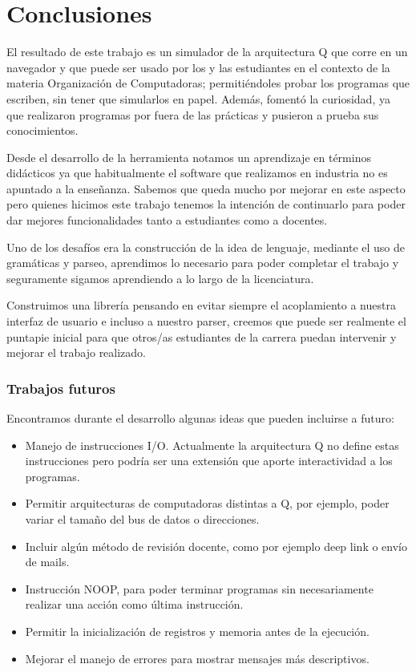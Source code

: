 \part{Conclusiones}
\label{parte_conclusiones}
El resultado de este trabajo es un simulador de la arquitectura Q que corre en un navegador y que puede ser usado por los y las estudiantes en 
el contexto de la materia Organización de Computadoras; permitiéndoles probar los programas que escriben, sin tener que simularlos en papel.
Además, fomentó la curiosidad, ya que realizaron programas por fuera de las prácticas y pusieron a prueba sus conocimientos. 

Desde el desarrollo de la herramienta notamos un aprendizaje en términos didácticos ya que habitualmente el software que realizamos en 
industria no es apuntado a la enseñanza. Sabemos que queda mucho por mejorar en este aspecto pero quienes hicimos este trabajo tenemos 
la intención de continuarlo para poder dar mejores funcionalidades tanto a estudiantes como a docentes.

Uno de los desafíos era la construcción de la idea de lenguaje, mediante el uso de gramáticas y parseo, aprendimos lo necesario para poder
completar el trabajo y seguramente sigamos aprendiendo a lo largo de la licenciatura.

Construimos una librería pensando en evitar siempre el acoplamiento a nuestra interfaz de usuario e incluso a nuestro parser, creemos que 
puede ser realmente el puntapie inicial para que otros/as estudiantes de la carrera puedan intervenir y mejorar el trabajo realizado.

\section{Trabajos futuros}
Encontramos durante el desarrollo algunas ideas que pueden incluirse a futuro:
\begin{itemize}
  \item Manejo de instrucciones I/O. Actualmente la arquitectura Q no define estas instrucciones pero podría ser una extensión que aporte
  interactividad a los programas.
  \item Permitir arquitecturas de computadoras distintas a Q, por ejemplo, poder variar el tamaño del bus de datos o direcciones.
  \item Incluir algún método de revisión docente, como por ejemplo deep link o envío de mails.
  \item Instrucción NOOP, para poder terminar programas sin necesariamente realizar una acción como última instrucción.
  \item Permitir la inicialización de registros y memoria antes de la ejecución.
  \item Mejorar el manejo de errores para mostrar mensajes más descriptivos.
\end{itemize}
